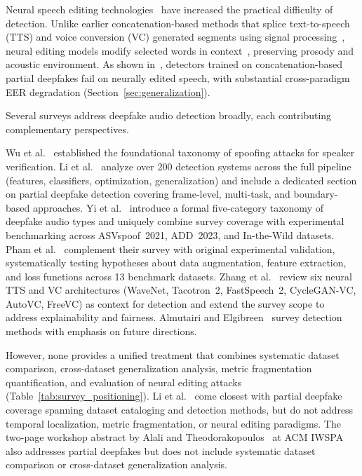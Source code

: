\documentclass[journal]{IEEEtran}
\begin{document}
Neural speech editing technologies~\cite{peng2024voicecraft,wang2025ssrspeech,vyas2023audiobox} have increased the practical difficulty of detection. Unlike earlier concatenation-based methods that splice text-to-speech (TTS) and voice conversion (VC) generated segments using signal processing~\cite{zhang2023partialspoof}, neural editing models modify selected words in context~\cite{kassmann2024speechediting}, preserving prosody and acoustic environment. As shown in~\cite{zhang2025partialedit}, detectors trained on concatenation-based partial deepfakes fail on neurally edited speech, with substantial cross-paradigm EER degradation (Section~\ref{sec:generalization}).

Several surveys address deepfake audio detection broadly, each contributing complementary perspectives.

Wu et al.~\cite{wu2015spoofing} established the foundational taxonomy of spoofing attacks for speaker verification. Li et al.~\cite{li2025survey} analyze over 200 detection systems across the full pipeline (features, classifiers, optimization, generalization) and include a dedicated section on partial deepfake detection covering frame-level, multi-task, and boundary-based approaches. Yi et al.~\cite{yi2023survey} introduce a formal five-category taxonomy of deepfake audio types and uniquely combine survey coverage with experimental benchmarking across ASVspoof~2021, ADD~2023, and In-the-Wild datasets. Pham et al.~\cite{pham2025survey} complement their survey with original experimental validation, systematically testing hypotheses about data augmentation, feature extraction, and loss functions across 13 benchmark datasets. Zhang et al.~\cite{zhang2025audiosurvey} review six neural TTS and VC architectures (WaveNet, Tacotron~2, FastSpeech~2, CycleGAN-VC, AutoVC, FreeVC) as context for detection and extend the survey scope to address explainability and fairness. Almutairi and Elgibreen~\cite{almutairi2022review} survey detection methods with emphasis on future directions.

However, none provides a unified treatment that combines systematic dataset comparison, cross-dataset generalization analysis, metric fragmentation quantification, and evaluation of neural editing attacks (Table~\ref{tab:survey_positioning}). Li et al.~\cite{li2025survey} come closest with partial deepfake coverage spanning dataset cataloging and detection methods, but do not address temporal localization, metric fragmentation, or neural editing paradigms. The two-page workshop abstract by Alali and Theodorakopoulos~\cite{alali2024deepfakesurvey} at ACM IWSPA also addresses partial deepfakes but does not include systematic dataset comparison or cross-dataset generalization analysis.
\end{document}
